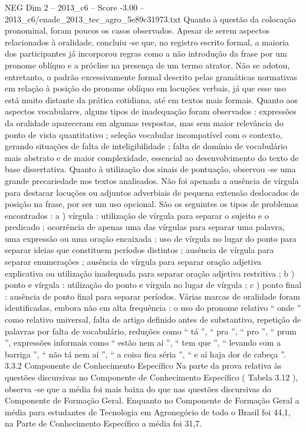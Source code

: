 \begin{textsample}{NEG Dim 2 – 2013\_c6 – Score -3.00 – 2013\_c6/enade\_2013\_tec\_agro\_5e89c31973.txt}
Quanto à questão da colocação pronominal, foram poucos os casos observados.
Apesar de serem aspectos relacionados à oralidade, concluiu -se que, no registro escrito formal, a maioria dos participantes já incorporou regras como a não introdução da frase por um pronome oblíquo e a próclise na presença de um termo atrator.
Não se adotou, entretanto, o padrão excessivamente formal descrito pelas gramáticas normativas em relação à posição do pronome oblíquo em locuções verbais, já que esse uso está muito distante da prática cotidiana, até em textos mais formais.
Quanto aos aspectos vocabulares, alguns tipos de inadequação foram observados : expressões da oralidade apareceram em algumas respostas, mas sem maior relevância do ponto de vista quantitativo ; seleção vocabular incompatível com o contexto, gerando situações de falta de inteligibilidade ; falta de domínio de vocabulário mais abstrato e de maior complexidade, essencial ao desenvolvimento do texto de base dissertativa.
Quanto à utilização dos sinais de pontuação, observou -se uma grande precariedade nos textos analisados.
Não foi apenada a ausência de vírgula para destacar locuções ou adjuntos adverbiais de pequena extensão deslocados de posição na frase, por ser um uso opcional.
São os seguintes os tipos de problemas encontrados : a ) vírgula : utilização de vírgula para separar o sujeito e o predicado ; ocorrência de apenas uma das vírgulas para separar uma palavra, uma expressão ou uma oração encaixada ; uso de vírgula no lugar do ponto para separar ideias que constituem períodos distintos ; ausência de vírgula para separar enumerações ; ausência de vírgula para separar oração adjetiva explicativa ou utilização inadequada para separar oração adjetiva restritiva ; b ) ponto e vírgula : utilização do ponto e vírgula no lugar de vírgula ; c ) ponto final : ausência de ponto final para separar períodos.
Várias marcas de oralidade foram identificadas, embora não em alta frequência : o uso do pronome relativo “ onde ” como relativo universal, falta de artigo definido antes de substantivo, repetição de palavras por falta de vocabulário, reduções como “ tá ”, “ pra ”, “ pro ”, “ prum ”, expressões informais como “ estão nem aí ”, “ tem que ”, “ levando com a barriga ”, “ não tá nem aí ”, “ a coisa fica séria ”, “ e aí haja dor de cabeça ”. 3.3.2 Componente de Conhecimento Específico Na parte da prova relativa às questões discursivas no Componente de Conhecimento Específico ( Tabela 3.12 ), observa -se que a média foi mais baixa do que nas questões discursivas do Componente de Formação Geral.
Enquanto no Componente de Formação Geral a média para estudantes de Tecnologia em Agronegócio de todo o Brasil foi 44,1, na Parte de Conhecimento Específico a média foi 31,7.

\end{textsample}
